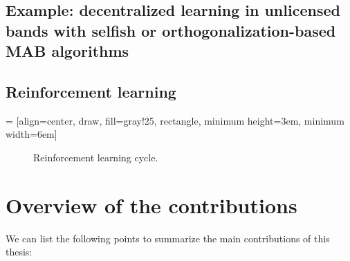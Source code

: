 \subsection{Example: decentralized learning in unlicensed bands with selfish or orthogonalization-based MAB algorithms}


\subsection{Reinforcement learning}

 = [align=center, draw, fill=gray!25, rectangle, minimum height=3em, minimum width=6em]
\begin{figure}[h!]
    \centering
\caption{Reinforcement learning cycle.}
\label{fig:1:ReinforcementLearningCycle}
\end{figure}


\section{Overview of the contributions}
\label{sec:1:contributions}

We can list the following points to summarize the main contributions of this thesis:

